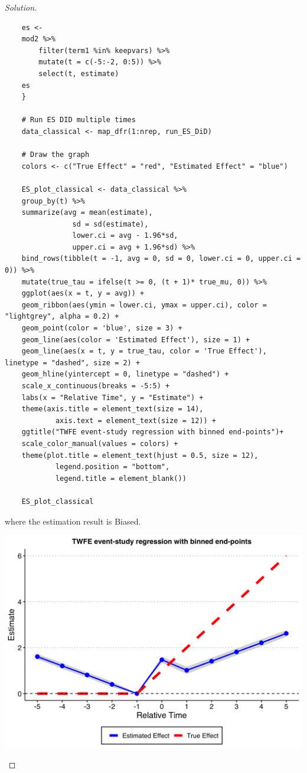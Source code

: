 \documentclass[11pt]{article}
\newenvironment{solution}{%
  \renewcommand\qedsymbol{$\blacksquare$}%
  \begin{mdframed}[backgroundcolor=gray!15]%
  \begin{proof}[Solution]}%
  {\end{proof}%
  \end{mdframed}}%
\begin{document}
\begin{enumerate}
\begin{solution}
\begin{lstlisting}
    es <-
    mod2 %>% 
        filter(term1 %in% keepvars) %>% 
        mutate(t = c(-5:-2, 0:5)) %>% 
        select(t, estimate)
    es
    }

    # Run ES DID multiple times
    data_classical <- map_dfr(1:nrep, run_ES_DiD)

    # Draw the graph
    colors <- c("True Effect" = "red", "Estimated Effect" = "blue")

    ES_plot_classical <- data_classical %>% 
    group_by(t) %>% 
    summarize(avg = mean(estimate),
                sd = sd(estimate),
                lower.ci = avg - 1.96*sd,
                upper.ci = avg + 1.96*sd) %>% 
    bind_rows(tibble(t = -1, avg = 0, sd = 0, lower.ci = 0, upper.ci = 0)) %>% 
    mutate(true_tau = ifelse(t >= 0, (t + 1)* true_mu, 0)) %>% 
    ggplot(aes(x = t, y = avg)) + 
    geom_ribbon(aes(ymin = lower.ci, ymax = upper.ci), color = "lightgrey", alpha = 0.2) +
    geom_point(color = 'blue', size = 3) + 
    geom_line(aes(color = 'Estimated Effect'), size = 1) + 
    geom_line(aes(x = t, y = true_tau, color = 'True Effect'), linetype = "dashed", size = 2) + 
    geom_hline(yintercept = 0, linetype = "dashed") + 
    scale_x_continuous(breaks = -5:5) + 
    labs(x = "Relative Time", y = "Estimate") + 
    theme(axis.title = element_text(size = 14),
            axis.text = element_text(size = 12)) +
    ggtitle("TWFE event-study regression with binned end-points")+
    scale_color_manual(values = colors) + 
    theme(plot.title = element_text(hjust = 0.5, size = 12),
            legend.position = "bottom", 
            legend.title = element_blank())

    ES_plot_classical
            \end{lstlisting}

            where the estimation result is Biased.

            \begin{center}
                \includegraphics[scale = 0.3]{Q5b_TWFE_2.png}
            \end{center}


\end{solution}
\end{enumerate}
\end{document}
